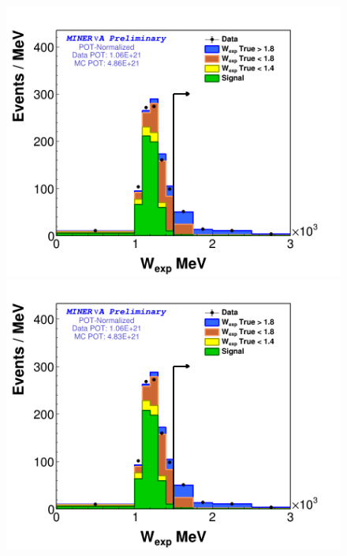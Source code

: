 \begin{figure}[!htb]
    \centering
    \includegraphics[scale=0.2]{Figures/Chapter4/BGStudies/Breakdown_WSideband_wexp_fit_1Pi_PN_1D_mixed.png}
    \includegraphics[scale=0.2]{Figures/Chapter4/BGStudies/Breakdown_WSideband_wexp_fit_1Pi_PN_1D_thetapi.png}

\end{figure}
